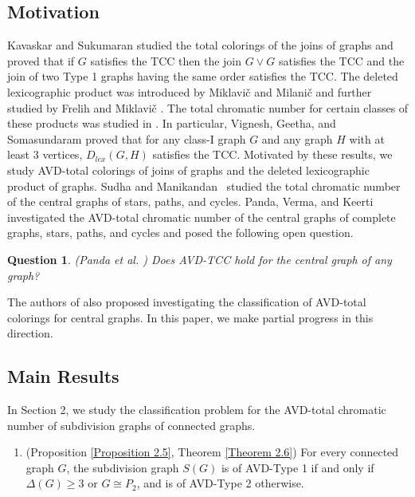 \documentclass[12pt,reqno,a4paper]{amsart}
\theoremstyle{definition}
\theoremstyle{plain}
\newtheorem{question}[defn]{Question}
\begin{document}
\subsection{Motivation} 
Kavaskar and Sukumaran \cite{KS2024} studied the total colorings of the joins of graphs and proved that if $G$ satisfies the TCC then the join $G\vee G$ satisfies the TCC and the join of two Type 1 graphs having the same order satisfies the TCC.
The deleted lexicographic product was introduced by Miklavi\v{c} and Milani\v{c} \cite{MM2011} and further studied by Frelih and Miklavi\v{c} \cite{FM2013}.
The total chromatic number for certain classes of these products was studied in \cite{SGS2024, SGS2022, VGS2018}.
In particular, Vignesh, Geetha, and Somasundaram \cite{VGS2018} proved that for any class-I graph $G$ and any graph $H$ with at least $3$ vertices, $D_{lex}(G, H)$ satisfies the TCC.
Motivated by these results, we study AVD-total colorings of joins of graphs and
the deleted lexicographic product of graphs.
Sudha and Manikandan~\cite{SM2017} studied the total chromatic number of the central graphs of stars, paths, and cycles.
Panda, Verma, and Keerti~\cite{PVK2020} investigated the AVD-total chromatic number of the central graphs of complete graphs, stars, paths, and cycles
and posed the following open question.

\begin{question}\label{Question 1.7}
(Panda et al. \cite{PVK2020}) Does AVD-TCC hold for the central graph of any graph?
\end{question}


The authors of \cite{PVK2020} also proposed investigating the classification of AVD-total colorings for central graphs. In this paper, we make partial progress in this direction.


\subsection{Main Results}

In Section 2, we study the classification problem for the AVD-total chromatic number of subdivision graphs of connected graphs. 

\begin{enumerate}
    \item (Proposition \ref{Proposition 2.5}, Theorem \ref{Theorem 2.6}) For every connected graph $G$, the subdivision graph $S(G)$ is of AVD-Type 1 if and only if 
    $\Delta(G)\geq 3$ or $G\cong P_2$, and is of AVD-Type 2 otherwise.
\end{enumerate}
\end{document}
